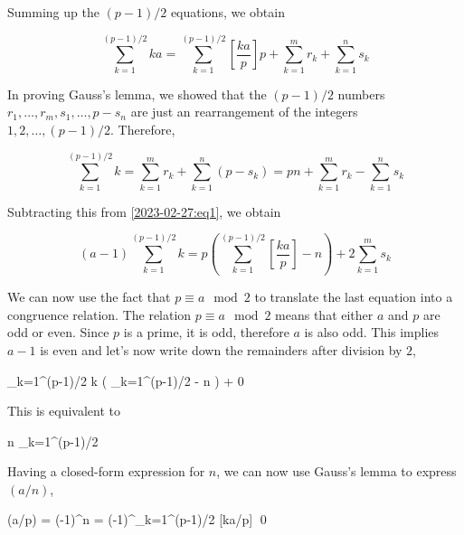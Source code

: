Summing up the $(p-1)/2$ equations, we obtain

\begin{equation}\label{2023-02-27:eq1}
    \sum_{k=1}^{(p-1)/2} ka = \sum_{k=1}^{(p-1)/2} \left[ \frac{ka}{p} \right] p + \sum_{k=1}^m r_k + \sum_{k=1}^n s_k
\end{equation}

In proving Gauss's lemma, we showed that the $(p-1)/2$ numbers $r_1, \ldots, r_m, s_1, \ldots, p - s_n$ are just an rearrangement of the integers $1, 2, \ldots, (p-1)/2$. Therefore,

\begin{equation*}
    \sum_{k=1}^{(p-1)/2} k  = \sum_{k=1}^m r_k + \sum_{k=1}^n (p - s_k) = pn + \sum_{k=1}^m r_k - \sum_{k=1}^n s_k
\end{equation*}

Subtracting this from \eqref{2023-02-27:eq1}, we obtain

\begin{equation*}
    (a-1) \sum_{k=1}^{(p-1)/2} k = p \left( \sum_{k=1}^{(p-1)/2} \left[ \frac{ka}{p} \right] - n \right) + 2\sum_{k=1}^m s_k 
\end{equation*}

We can now use the fact that $p \equiv a \mod 2$ to translate the last equation into a congruence relation. The relation $p \equiv a \mod 2$ means that either $a$ and $p$ are odd or even. Since $p$ is a prime, it is odd, therefore $a$ is also odd. This implies $a-1$ is even and let's now write down the remainders after division by $2$,

 \cdot \sum_{k=1}^{(p-1)/2} k  \cdot \left( \sum_{k=1}^{(p-1)/2}  - n \right) + 0
\eee

This is equivalent to

\bee
n \equiv \sum_{k=1}^{(p-1)/2}  
\eee

Having a closed-form expression for $n$, we can now use Gauss's lemma to express $(a/n)$,

\bee
(a/p) = (-1)^n = (-1)^{\sum_{k=1}^{(p-1)/2} [ka/p]} \qed
\eee

